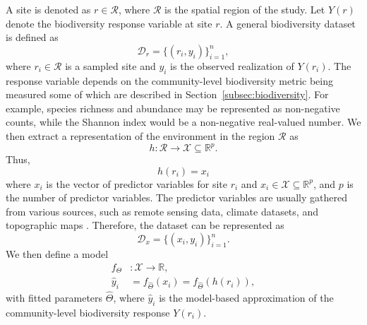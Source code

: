 A site is denoted as \(r \in \mathcal{R}\), where \(\mathcal{R}\) is the spatial region of the study. Let \(Y(r)\) denote the biodiversity response variable at site \(r\). A general biodiversity dataset is defined as 
\[\mathcal{D}_r = \{(r_i,y_i)\}_{i=1}^n,\] 
where \(r_i \in \mathcal{R}\) is a sampled site and \(y_i\) is the observed realization of \(Y(r_i)\). The response variable depends on the community-level biodiversity metric being measured some of which are described in Section~\ref{subsec:biodiversity}. For example, species richness and abundance may be represented as non-negative counts, while the Shannon index would be a non-negative real-valued number. We then extract a representation of the environment in the region \(\mathcal{R}\) as 
\[h: \mathcal{R} \rightarrow \mathcal{X} \subseteq \mathbb{R}^p.\] 
Thus, 
\[h(r_i) = x_i\] 
where \(x_i\) is the vector of predictor variables for site \(r_i\) and \(x_i \in \mathcal{X} \subseteq \mathbb{R}^p\), and \(p\) is the number of predictor variables. The predictor variables are usually gathered from various sources, such as remote sensing data, climate datasets, and topographic maps \parencite{waltari2014, beery2021}. Therefore, the dataset can be represented as 
\[\mathcal{D}_x = \{(x_i,y_i)\}_{i=1}^n.\] 
We then define a model 
\[
\begin{aligned}
f_\Theta &: \mathcal{X} \rightarrow \mathbb{R}, \\
\hat{y}_i &= f_{\hat{\Theta}}(x_i) = f_{\hat{\Theta}}(h(r_i)),
\end{aligned}
\]
with fitted parameters \(\hat{\Theta}\), where \(\hat{y}_i\) is the model-based approximation of the community-level biodiversity response \(Y(r_i)\). 

